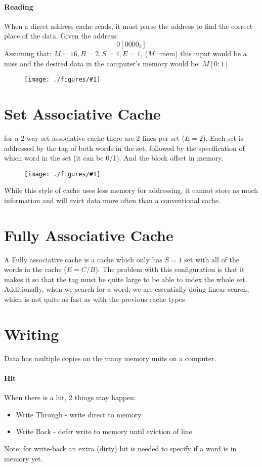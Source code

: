 \documentclass[12pt]{book}
\newcommand{\incimg}[2]{%
       \begin{figure}[h]
               \centering
               \texttt{[image: ./figures/\#1]}
       \end{figure}
}
\begin{document}
\paragraph*{Reading}
When a direct address cache reads, it must parse the address to find the correct place of the data.
Given the address:
\[0[0000_2]\]
Assuming that: $M=16, B=2, S=4, E=1$, ($M$=mem) this input would be a miss and the desired data in the computer's memory would be:
$M[0:1]$
\incimg{cacheInp}{0.3}

\section*{Set Associative Cache}
for a 2 way set associative cache there are 2 lines per set ($E=2$).
Each set is addressed by the tag of both words in the set, followed 
by the specification of which word in the set (it can be 0/1). And
the block offset in memory.

\incimg{assCache}{0.5}

While this style of cache uses less memory for addressing, it 
cannot store as much information and will evict data more often than
a conventional cache.

\section*{Fully Associative Cache}
A Fully associative cache is a cache which only has $S=1$ set with
all of the words in the cache ($E=C/B$). The problem with this configuration
is that it makes it so that the tag must be quite large to be able to
index the whole set. Additionally, when we search for a word, we are
essentially doing linear search, which is not quite as fast as
with the previous cache types
\pagebreak

\section*{Writing}
Data has multiple copies on the many memory units on a computer.

\paragraph{Hit}
When there is a hit, 2 things may happen:
\begin{itemize}
        \item Write Through - write direct to memory
        \item Write Back - defer write to memory until eviction of line
\end{itemize}
Note: for write-back an extra (dirty) bit is needed to specify 
if a word is in memory yet.
\end{document}
